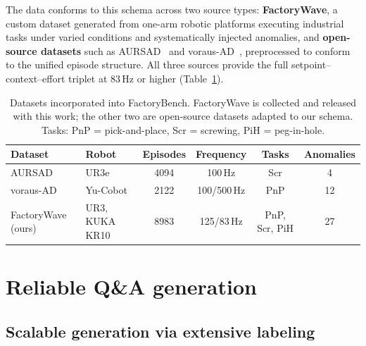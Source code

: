 The data conforms to this schema across two source types: \textbf{FactoryWave}, a custom dataset generated from one-arm robotic platforms executing industrial tasks under varied conditions and systematically injected anomalies, and \textbf{open-source datasets} such as AURSAD~\cite{leporowski2022aursad} and voraus-AD~\cite{brockmann2023vorausad}, preprocessed to conform to the unified episode structure. All three sources provide the full setpoint--context--effort triplet at 83\,Hz or higher (Table~\ref{tab:datasets}).

\begin{table}[htbp]
    \centering
    \caption{Datasets incorporated into FactoryBench. FactoryWave is collected and released with this work; the other two are open-source datasets adapted to our schema. Tasks: PnP = pick-and-place, Scr = screwing, PiH = peg-in-hole.}
    \label{tab:datasets}
    \small
    \setlength{\tabcolsep}{4pt}
    \begin{tabular}{@{}l l c c c c@{}}
        \toprule
        Dataset                                & Robot          & Episodes & Frequency   & Tasks         & Anomalies \\
        \midrule
        AURSAD~\cite{leporowski2022aursad}     & UR3e           & 4094     & 100\,Hz     & Scr           & 4         \\
        voraus-AD~\cite{brockmann2023vorausad} & Yu-Cobot       & 2122     & 100/500\,Hz & PnP           & 12        \\
        FactoryWave (ours)                     & UR3, KUKA KR10 & 8983     & 125/83\,Hz  & PnP, Scr, PiH & 27        \\
        \bottomrule
    \end{tabular}
\end{table}

\section{Reliable Q\&A generation}

\subsection{Scalable generation via extensive labeling}


